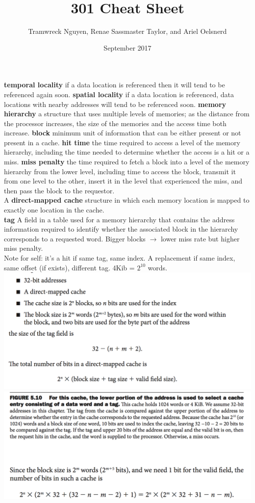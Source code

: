 \documentclass[9pt, letterpaper]{article}
\title{301 Cheat Sheet}
\author{Tramwreck Nguyen, Renae Sassmaster Taylor, and Ariel Oelsnerd}
\date{September 2017}
\begin{document}
\textbf{temporal locality} if a data location is referenced then it will tend to be referenced again soon. \textbf{spatial locality} if a data location is referenced, data locations with nearby addresses will tend to be referenced soon. \textbf{memory hierarchy} a structure that uses multiple levels of memories; as the distance from the processor increases, the size of the memories and the access time both increase.  \textbf{block} minimum unit of information that can be either present or not present in a cache. 
\textbf{hit time} the time required to access a level of the memory hierarchy, including the time needed to determine whether the access is a hit or a miss. \textbf{miss penalty} the time required to fetch a block into a level of the memory hierarchy from the lower level, including time to access the block, transmit it from one level to the other, insert it in the level that experienced the miss, and then pass the block to the requestor.\\
A \textbf{direct-mapped cache} structure in which each memory location is mapped to exactly one location in the cache.\\ \textbf{tag} A field in a table used for a memory hierarchy that contains the address information required
to identify whether the associated block in the hierarchy corresponds to a requested word. Bigger blocks $\to$ lower miss rate but higher miss penalty. \\
Note for self: it's a hit if same tag, same index. A replacement if same index, same offset (if exists), different tag. 4Kib = $2^{10}$ words.\\
\includegraphics[scale=0.35]{blockSizeFormula.png}
\includegraphics[scale=0.4]{blockSize.png}
\end{document}
